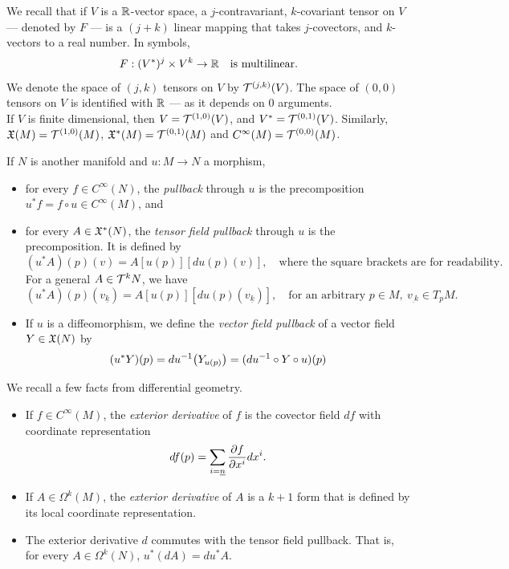 \documentclass[../main-v2-manifolds.tex]{subfiles}
\begin{document}
\begin{note}
    We recall that if $V$ is a $\mathbb{R}$-vector space, a $j$-contravariant, $k$-covariant tensor on $V$ --- denoted by $F$ --- is a $(j+k)$ linear mapping that takes $j$-covectors, and $k$-vectors to a real number. In symbols,
    \[
        F: (V^*)^j \times V^k\to\mathbb{R}\quad\text{is multilinear.}
    \]
    We denote the space of $(j,k)$ tensors on $V$ by $\mathcal{T}^{(j,k)}(V)$. The space of $(0,0)$ tensors on $V$ is identified with $\mathbb{R}$ --- as it depends on $0$ arguments. \\
    
    If $V$ is finite dimensional, then $V=\mathcal{T}^{(1,0)}(V)$, and $V^* = \mathcal{T}^{(0,1)}(V)$.
    Similarly, $\mathfrak{X}(M) = \mathcal{T}^{(1,0)}(M)$,  $\mathfrak{X}^*(M) = \mathcal{T}^{(0,1)}(M)$ and $C^\infty(M) = \mathcal{T}^{(0,0)}(M)$.
\end{note}
If $N$ is another manifold and $u: M\to N$ a morphism, 
\begin{itemize}
    \item for every $f\in C^\infty(N)$, the \emph{pullback} through $u$ is the precomposition $u^*f = f\circ u\in C^\infty(M)$, and
    \item for every $A\in\mathfrak{X}^*(N)$, the \emph{tensor field pullback} through $u$ is the precomposition.  It is defined by
    \[
        (u^*A)(p)(v) = A[u(p)][du(p)(v)],\quad\text{where the square brackets are for readability.}
    \]
    For a general $A\in \mathcal{T}^{k}N$, we have
    \[
        (u^*A)(p)(v_{\underline{k}}) = A[u(p)][du(p)(v_{\underline{k}})],\quad\text{for an arbitrary }p\in M,\: v_{\underline{}k}\in T_pM.
    \]
    \item If $u$ is a diffeomorphism, we define the \emph{vector field pullback} of a vector field $Y\in\mathfrak{X}(N)$ by
    \[
        (u^*Y)(p) = du^{-1}\qty(Y_{u(p)}) = (du^{-1}\circ Y\circ u)(p)
    \]
\end{itemize}
We recall a few facts from differential geometry.
\begin{itemize}
    \item If $f\in C^\infty(M)$, the \emph{exterior derivative} of $f$ is the covector field $df$ with coordinate representation
    \[
        df(p) = \sum_{i=\underline{n}}\pdv{f}{x^i}dx^i.
    \]
    \item If $A\in \Omega^k(M)$, the \emph{exterior derivative} of $A$ is a $k+1$ form that is defined by its local coordinate representation. 
    \item The exterior derivative $d$ commutes with the tensor field pullback. That is, for every $A\in \Omega^k(N)$, $u^*(dA) = du^*A$.
\end{itemize}
\end{document}
